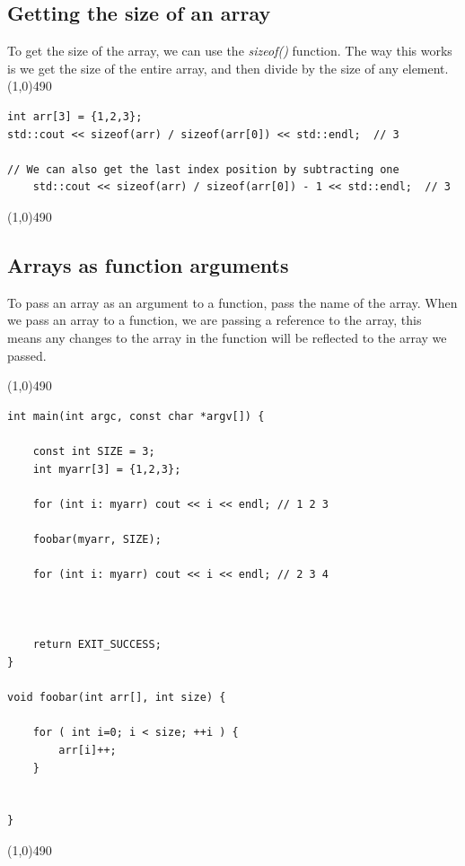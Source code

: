 \documentclass{report}
\begin{document}
   \pagebreak \bigbreak \noindent 
   \subsection{Getting the size of an array}
   \bigbreak \noindent 
   To get the size of the array, we can use the \textit{sizeof()} function. The way this works is we get the size of the entire array, and then divide by the size of any element.
   \bigbreak \noindent 
    \line(1,0){490}
    \begin{verbatim}
int arr[3] = {1,2,3};
std::cout << sizeof(arr) / sizeof(arr[0]) << std::endl;  // 3

// We can also get the last index position by subtracting one
    std::cout << sizeof(arr) / sizeof(arr[0]) - 1 << std::endl;  // 3
    \end{verbatim}
    \line(1,0){490}
    \bigbreak \noindent 

    \bigbreak \noindent 
    \subsection{Arrays as function arguments}
    \bigbreak \noindent 
    \begin{concept}
  To pass an array as an argument to a function, pass the name of the array. When we pass an array to a function, we are passing a reference to the array, this means any changes to the array in the function will be reflected to the array we passed.
	\end{concept}
    \bigbreak \noindent 
    \line(1,0){490}
    \begin{verbatim}
int main(int argc, const char *argv[]) {

    const int SIZE = 3;
    int myarr[3] = {1,2,3};

    for (int i: myarr) cout << i << endl; // 1 2 3

    foobar(myarr, SIZE);

    for (int i: myarr) cout << i << endl; // 2 3 4



    return EXIT_SUCCESS;
}

void foobar(int arr[], int size) {

    for ( int i=0; i < size; ++i ) {
        arr[i]++;
    }


}
    \end{verbatim}
    \line(1,0){490}

    \bigbreak \noindent 
\end{document}
